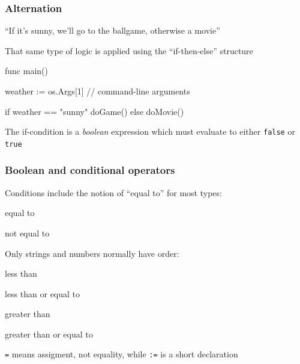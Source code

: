 \documentclass[handout,compress,t,11pt]{beamer}
\begin{document}
\begin{frame}[fragile]
    \frametitle{Alternation}
    ``If it's sunny, we'll go to the ballgame, otherwise a movie'' \par
    \vspace{0.5\baselineskip}
    That same type of logic is applied using the ``if-then-else'' structure
\begin{golang}
func main() {
    weather := os.Args[1]     // command-line arguments

    if weather == "sunny" {
        doGame()
    } else {
        doMovie()
    }
}
\end{golang}
    \vspace{0.5\baselineskip}
The if-condition is a {\em boolean} expression which must evaluate
to either \verb|false| or \verb|true|
\end{frame}

\begin{frame}[fragile]
    \frametitle{Boolean and conditional operators}
    Conditions include the notion of ``equal to'' for most types: \par
    \vspace{-0.2\baselineskip}
\begin{description}[labelwidth=1in,align=right]
\item [{\color{black}{\tt ==}}] equal to
\item [{\color{black}{\tt !=}}] not equal to
\end{description}
    \vspace{0.5\baselineskip}
Only strings and numbers normally have order:
    \vspace{-0.2\baselineskip}
\begin{description}[labelwidth=1in,align=right]
\item [{\color{black}{\tt \:\:<}}] less than
\item [{\color{black}{\tt <=}}] less than or equal to
\item [{\color{black}{\tt \:\:>}}] greater than
\item [{\color{black}{\tt >=}}] greater than or equal to
\end{description}
    \vspace{1.5\baselineskip}
\verb|=| means assigment, not equality, while \verb|:=| is a short declaration
\end{frame}
\end{document}
